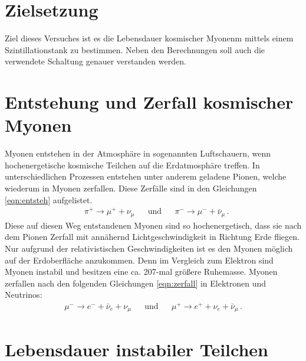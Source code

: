 \section{Zielsetzung}
    \setcounter{page}{1}
    Ziel dieses Versuches ist es die Lebensdauer kosmischer Myonenm mittels einem Szintillationstank zu bestimmen. 
    Neben den Berechnungen soll auch die verwendete Schaltung genauer verstanden werden.

    \section{Entstehung und Zerfall kosmischer Myonen}
        Myonen entstehen in der Atmosphäre in sogenannten Luftschauern, wenn hochenergetische kosmische Teilchen auf die Erdatmosphäre treffen.
        In unterschiedlichen Prozessen entstehen unter anderem geladene Pionen, welche wiederum in Myonen zerfallen.
        Diese Zerfälle sind in den Gleichungen \ref{eqn:entsteh} aufgelistet.
        \begin{align}
            &\pi^+ \rightarrow \mu^+ + \nu_\mu && \text{und} && \pi^- \rightarrow \mu^- + \bar{\nu}_\mu \, .
            \label{eqn:entsteh}
        \end{align}
        Diese auf diesen Weg entstandenen Myonen sind so hochenergetisch, 
        dass sie nach dem Pionen Zerfall mit annähernd Lichtgeschwindigkeit in Richtung Erde fliegen.
        Nur aufgrund der relativistischen Geschwindigkeiten ist es den Myonen möglich auf der Erdoberfläche anzukommen. 
        Denn im Vergleich zum Elektron sind Myonen instabil und besitzen eine ca. 207-mal größere Ruhemasse. 
        Myonen zerfallen nach den folgenden Gleichungen \ref{eqn:zerfall} in Elektronen und Neutrinos:
        \begin{align}
            \mu^- \rightarrow e^- + \bar{\nu}_e + \nu_\mu && \text{und} &&  \mu^+ \rightarrow e^+ + \nu_e + \bar{\nu}_\mu \, .
            \label{eqn:zerfall} 
        \end{align} 

    \section{Lebensdauer instabiler Teilchen}

